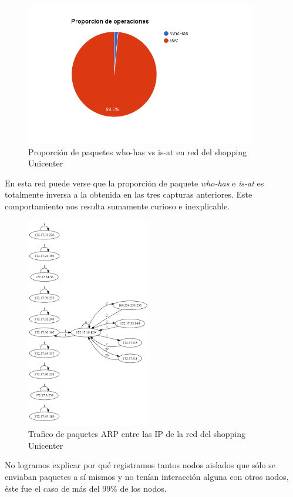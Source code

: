 \begin{figure}[H]
  \centering
    \includegraphics[width=0.9\textwidth]{imagenes/unicenter/proporcion_paquetes_arp.png}
  \caption{Proporción de paquetes who-has vs is-at en red del shopping Unicenter}
  \label{fig:ejemplo}
\end{figure}

En esta red puede verse que la proporción de paquete \textit{who-has} e \textit{is-at} es totalmente inversa a la obtenida en las tres capturas anteriores. Este comportamiento nos resulta sumamente curioso e inexplicable.

\begin{figure}[H]
  \centering
    \includegraphics[width=0.48\textwidth]{imagenes/unicenter/digrafo_unicenter.png}
  \caption{Trafico de paquetes ARP entre las IP de la red del shopping Unicenter}
  \label{fig:ejemplo}
\end{figure}

No logramos explicar por qué registramos tantos nodos aislados que sólo se enviaban paquetes a sí mismos y no tenían interacción alguna con otros nodos, éste fue el caso de más del $99\%$ de los nodos.

